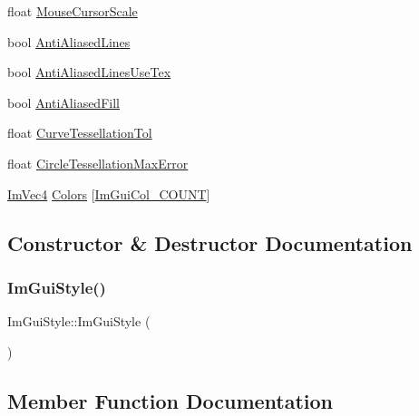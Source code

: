 \begin{DoxyCompactItemize}
\item 
float \hyperlink{structImGuiStyle_a6448eb2273c8868d7ecccf1152857f68}{Mouse\+Cursor\+Scale}
\item 
bool \hyperlink{structImGuiStyle_a0164b54454297971d40f3578b2c1ffeb}{Anti\+Aliased\+Lines}
\item 
bool \hyperlink{structImGuiStyle_acd4afaf40109ed79815b8bfe9ad6b4f2}{Anti\+Aliased\+Lines\+Use\+Tex}
\item 
bool \hyperlink{structImGuiStyle_a1fcc22c258a2a73bd61efd18e7ce7e5a}{Anti\+Aliased\+Fill}
\item 
float \hyperlink{structImGuiStyle_a41eb9377b63b8b85ab807c28e00198e9}{Curve\+Tessellation\+Tol}
\item 
float \hyperlink{structImGuiStyle_acc8b73cb356dfad30703f851ec973c65}{Circle\+Tessellation\+Max\+Error}
\item 
\hyperlink{structImVec4}{Im\+Vec4} \hyperlink{structImGuiStyle_a2b4941240a38d1300c39a7fa4f03d0a3}{Colors} \mbox{[}\hyperlink{imgui_8h_a8e46ef7d0c76fbb1916171edfa4ae9e7ac911e17bec14cc3339cf3901a197628b}{Im\+Gui\+Col\+\_\+\+C\+O\+U\+NT}\mbox{]}
\end{DoxyCompactItemize}


\subsection{Constructor \& Destructor Documentation}
\mbox{\label{structImGuiStyle_ab0a3ffb3aeec3e6b09b9bde812b28369}} 
\subsubsection{\texorpdfstring{Im\+Gui\+Style()}{ImGuiStyle()}}
{\footnotesize\ttfamily Im\+Gui\+Style\+::\+Im\+Gui\+Style (\begin{DoxyParamCaption}{ }\end{DoxyParamCaption})}



\subsection{Member Function Documentation}
\mbox{\label{structImGuiStyle_a7c9d3e0974a239f65e433cc952be0627}} 
